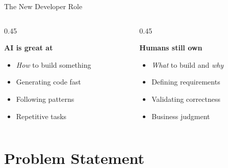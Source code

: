 \documentclass[aspectratio=169]{beamer}
\begin{document}
\begin{frame}{The New Developer Role}
    \vspace{0.3cm}
    \begin{columns}[T]
        \begin{column}{0.45\textwidth}
            \colorbox{utu_green!20}{\parbox{0.95\textwidth}{\centering\textbf{AI is great at}}}
            \vspace{0.3cm}
            \begin{itemize}
                \item \textit{How} to build something
                \item Generating code fast
                \item Following patterns
                \item Repetitive tasks
            \end{itemize}
        \end{column}
        \begin{column}{0.45\textwidth}
            \colorbox{utu_pink!20}{\parbox{0.95\textwidth}{\centering\textbf{Humans still own}}}
            \vspace{0.3cm}
            \begin{itemize}
                \item \textit{What} to build and \textit{why}
                \item Defining requirements
                \item Validating correctness
                \item Business judgment
            \end{itemize}
        \end{column}
    \end{columns}
\end{frame}

\section{Problem Statement}
\end{document}
